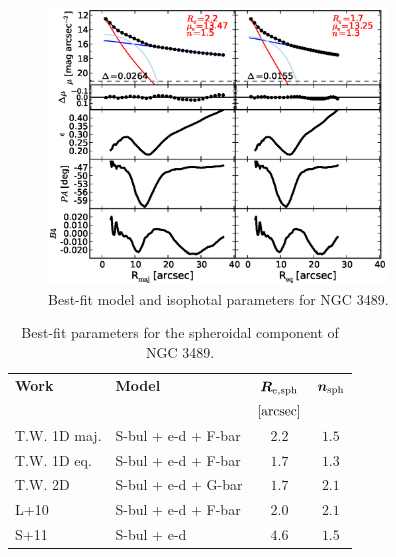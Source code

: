 \documentclass[preprint2]{emulateapj}
\newcommand{\fitfigurewidth}{0.8\textwidth}
\begin{document}
  \begin{figure}[h]
  \begin{center}
  \includegraphics[width=\fitfigurewidth]{images/n3489_1Dfit.eps}
  \caption{Best-fit model and isophotal parameters for NGC 3489.}
  \end{center}
  \end{figure}

  \begin{table}[h]
  \small
  \caption{Best-fit parameters for the spheroidal component of NGC 3489.}
  \begin{center}
  \begin{tabular}{llcc}
  \hline
  {\bf Work} & {\bf Model}   & $\bm R_{\rm e,sph}$    & $\bm n_{\rm sph}$ \\
    &  &  $[\rm arcsec]$ & \\
  \hline
  T.W. 1D maj. & S-bul + e-d + F-bar & $2.2$  &  $1.5$ \\
  T.W. 1D eq.  & S-bul + e-d + F-bar & $1.7$  &  $1.3$ \\
  T.W. 2D      & S-bul + e-d + G-bar & $1.7$  &  $2.1$ \\
  \hline
  L+10         & S-bul + e-d + F-bar & $2.0$  &  $2.1$ \\
  S+11         & S-bul + e-d & $4.6$  &  $1.5$ \\
  \hline
  \end{tabular}
  \end{center}
  \label{tab:n3489}
  \end{table}
\end{document}
